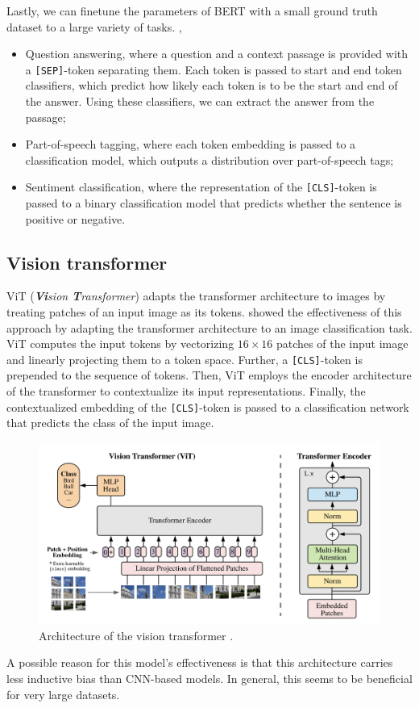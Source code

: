 Lastly, we can finetune the parameters of BERT with a small ground truth dataset to a large variety
of tasks. \Eg,
\begin{itemize}
    \item Question answering, where a question and a context passage is provided with a \texttt{[SEP]}-token
          separating them. Each token is passed to start and end token classifiers, which predict how likely
          each token is to be the start and end of the answer. Using these classifiers, we can extract the
          answer from the passage;
    \item Part-of-speech tagging, where each token embedding is passed to a classification model, which
          outputs a distribution over part-of-speech tags;
    \item Sentiment classification, where the representation of the \texttt{[CLS]}-token is passed to a
          binary classification model that predicts whether the sentence is positive or negative.
\end{itemize}

\subsection{Vision transformer}

ViT (\textit{\textbf{Vi}sion \textbf{T}ransformer}) \citep{dosovitskiy2020image} adapts the
transformer architecture to images by treating patches of an input image as its tokens.
\citet{dosovitskiy2020image} showed the effectiveness of this approach by adapting the transformer
architecture to an image classification task. ViT computes the input tokens by vectorizing $16
    \times 16$ patches of the input image and linearly projecting them to a token space. Further, a
\texttt{[CLS]}-token is prepended to the sequence of tokens. Then, ViT employs the encoder
architecture of the transformer to contextualize its input representations. Finally, the
contextualized embedding of the \texttt{[CLS]}-token is passed to a classification network that
predicts the class of the input image.

\begin{figure}[t]
    \centering
    \includegraphics[width=\textwidth]{figures/vit}
    \caption{Architecture of the vision transformer \citep{dosovitskiy2020image}.}
    \label{fig:vit}
\end{figure}

A possible reason for this model's effectiveness is that this architecture carries less inductive
bias than CNN-based models. In general, this seems to be beneficial for very large datasets.
